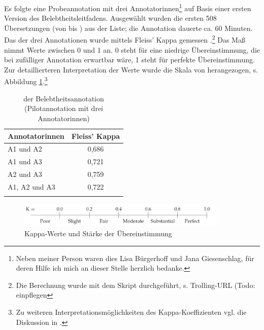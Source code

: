 Es folgte eine Probeannotation mit drei Annotatorinnen\footnote{Neben meiner Person waren dies Lisa Bürgerhoff und Jana Giesenschlag, für deren Hilfe ich mich an dieser Stelle herzlich bedanke.} auf Basis einer ersten Version des Belebtheitsleitfadens. Ausgewählt wurden die ersten 508 Übersetzungen (von  bis ) aus der Liste; die Annotation dauerte ca. 60 Minuten. Das  der drei Annotationen wurde mittels Fleiss' Kappa gemessen \parencite{Fleiss1971}.\footnote{Die Berechnung wurde mit dem Skript  durchgeführt, s. Trolling-URL (Todo: einpflegen} Das Maß nimmt Werte zwischen 0 und 1 an. 
0 steht für eine niedrige Übereinstimmung, die bei zufälliger Annotation erwartbar wäre, 1 steht für perfekte Übereinstimmung. Zur detaillierteren Interpretation der Werte wurde die Skala von \textcite{Landis1977} herangezogen, s. Abbildung \ref{abb:kappa-skala}.\footnote{Zu weiteren Interpretationsmöglichkeiten des Kappa-Koeffizienten vgl. die Diskussion in \textcite[576-577]{Artstein2008}.}

\begin{table}
\centering
\label{tab:iaa-pilot}
\begin{tabular}{lc}
\lsptoprule
Annotatorinnen & Fleiss' Kappa  \\ \midrule
A1 und A2               & 0,686  \\
A1 und A3               & 0,721  \\
A2 und A3               & 0,759  \\
A1, A2 und A3           & 0,722  \\ \lspbottomrule
\end{tabular}
\caption{ der Belebtheitsannotation (Pilotannotation mit drei Annotatorinnen)}
\end{table}

\begin{figure}
\begin{center}
\includegraphics[width=10cm]{images/kappa-artstein.jpg}
\caption {Kappa-Werte und Stärke der Übereinstimmung \\ \parencite[576]{Artstein2008}}
\label{abb:kappa-skala}
\end{center}
\end{figure} 


